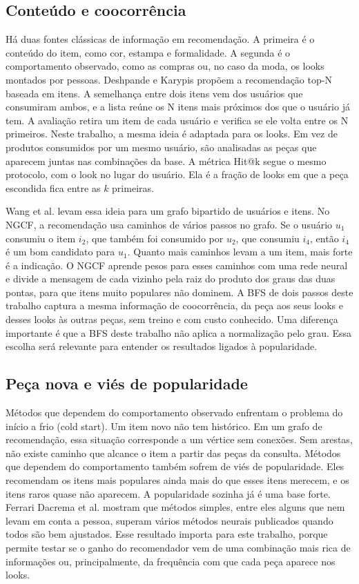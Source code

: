 \documentclass[conference]{IEEEtran}
\begin{document}
\subsection{Conteúdo e coocorrência}

Há duas fontes clássicas de informação em recomendação. A primeira é o conteúdo do item, como cor, estampa e formalidade. A segunda é o comportamento observado, como as compras ou, no caso da moda, os looks montados por pessoas. Deshpande e Karypis \cite{deshpande2004} propõem a recomendação top-N baseada em itens. A semelhança entre dois itens vem dos usuários que consumiram ambos, e a lista reúne os N itens mais próximos dos que o usuário já tem. A avaliação retira um item de cada usuário e verifica se ele volta entre os N primeiros. Neste trabalho, a mesma ideia é adaptada para os looks. Em vez de produtos consumidos por um mesmo usuário, são analisadas as peças que aparecem juntas nas combinações da base. A métrica Hit@k segue o mesmo protocolo, com o look no lugar do usuário. Ela é a fração de looks em que a peça escondida fica entre as $k$ primeiras.

Wang et al. \cite{wang2019} levam essa ideia para um grafo bipartido de usuários e itens. No NGCF, a recomendação usa caminhos de vários passos no grafo. Se o usuário $u_1$ consumiu o item $i_2$, que também foi consumido por $u_2$, que consumiu $i_4$, então $i_4$ é um bom candidato para $u_1$. Quanto mais caminhos levam a um item, mais forte é a indicação. O NGCF aprende pesos para esses caminhos com uma rede neural e divide a mensagem de cada vizinho pela raiz do produto dos graus das duas pontas, para que itens muito populares não dominem. A BFS de dois passos deste trabalho captura a mesma informação de coocorrência, da peça aos seus looks e desses looks às outras peças, sem treino e com custo conhecido. Uma diferença importante é que a BFS deste trabalho não aplica a normalização pelo grau. Essa escolha será relevante para entender os resultados ligados à popularidade.

\subsection{Peça nova e viés de popularidade}

Métodos que dependem do comportamento observado enfrentam o problema do início a frio (cold start). Um item novo não tem histórico. Em um grafo de recomendação, essa situação corresponde a um vértice sem conexões. Sem arestas, não existe caminho que alcance o item a partir das peças da consulta. Métodos que dependem do comportamento também sofrem de viés de popularidade. Eles recomendam os itens mais populares ainda mais do que esses itens merecem, e os itens raros quase não aparecem. A popularidade sozinha já é uma base forte. Ferrari Dacrema et al. \cite{dacrema2019} mostram que métodos simples, entre eles alguns que nem levam em conta a pessoa, superam vários métodos neurais publicados quando todos são bem ajustados. Esse resultado importa para este trabalho, porque permite testar se o ganho do recomendador vem de uma combinação mais rica de informações ou, principalmente, da frequência com que cada peça aparece nos looks.
\end{document}
